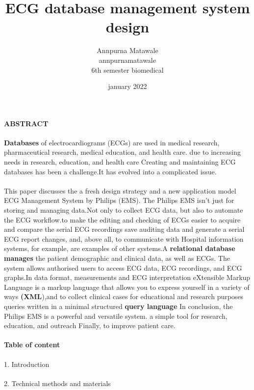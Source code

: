 \documentclass[12pt]{article}
\title{\textbf{ECG database management system design}}
\author{Annpurna Matawale\\annpurnamatawale\\6th semester biomedical}
\date {  january 2022}
\begin{document}
\maketitle
\textbf{ABSTRACT}
\paragraph{}
\textbf{Databases} of electrocardiograms (ECGs) are used in medical research, pharmaceutical research, medical education, and health care. due to increasing needs in research, education, and health care Creating and maintaining ECG databases has been a challenge.It has evolved into a complicated issue.\paragraph{} This paper discusses the a fresh design strategy and a new application model
ECG Management System by Philips (EMS). The Philips EMS isn't just for storing and managing data.Not only to collect ECG data, but also to automate the ECG workflow.to make the editing and checking of ECGs easier to acquire and compare the serial ECG recordings
save auditing data and generate a serial ECG report changes, and, above all, to communicate with Hospital information systems, for example, are examples of other systems.A \textbf{relational database manages }the patient demographic and clinical data, as well as ECGs. The system allows authorised users to access ECG data, ECG recordings, and ECG graphs.In data format, measurements and ECG interpretation eXtensible Markup Language is a markup language that allows you to express yourself in a variety of ways \textbf{(XML}),and to collect clinical cases for educational and research purposes queries written in a minimal structured \textbf{query language} In conclusion, the Philips EMS is a powerful and versatile system.
a simple tool for research, education, and outreach
Finally, to improve patient care.

\paragraph{\textbf{Table of content}}
\paragraph{}1. Introduction \paragraph{} 2. Technical methods and materials
\end{document}
